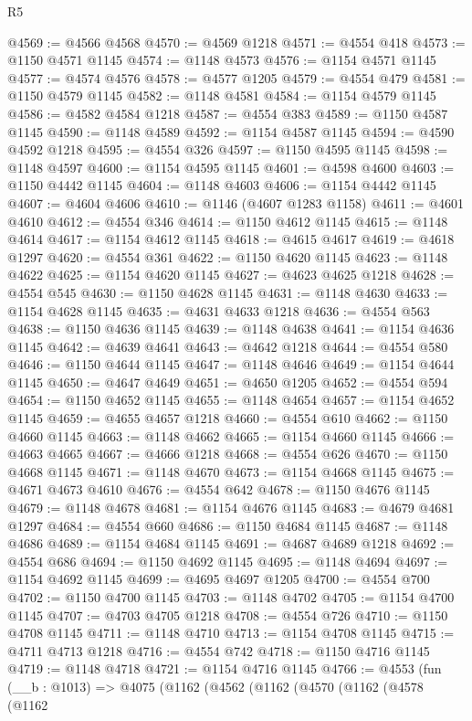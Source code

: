 \begin{lexlean}{R5}
\begin{coremodule}
@4569 := @4566 @4568
@4570 := @4569 @1218
@4571 := @4554 @418
@4573 := @1150 @4571 @1145
@4574 := @1148 @4573
@4576 := @1154 @4571 @1145
@4577 := @4574 @4576
@4578 := @4577 @1205
@4579 := @4554 @479
@4581 := @1150 @4579 @1145
@4582 := @1148 @4581
@4584 := @1154 @4579 @1145
@4586 := @4582 @4584 @1218
@4587 := @4554 @383
@4589 := @1150 @4587 @1145
@4590 := @1148 @4589
@4592 := @1154 @4587 @1145
@4594 := @4590 @4592 @1218
@4595 := @4554 @326
@4597 := @1150 @4595 @1145
@4598 := @1148 @4597
@4600 := @1154 @4595 @1145
@4601 := @4598 @4600
@4603 := @1150 @4442 @1145
@4604 := @1148 @4603
@4606 := @1154 @4442 @1145
@4607 := @4604 @4606
@4610 := @1146 (@4607 @1283 @1158)
@4611 := @4601 @4610
@4612 := @4554 @346
@4614 := @1150 @4612 @1145
@4615 := @1148 @4614
@4617 := @1154 @4612 @1145
@4618 := @4615 @4617
@4619 := @4618 @1297
@4620 := @4554 @361
@4622 := @1150 @4620 @1145
@4623 := @1148 @4622
@4625 := @1154 @4620 @1145
@4627 := @4623 @4625 @1218
@4628 := @4554 @545
@4630 := @1150 @4628 @1145
@4631 := @1148 @4630
@4633 := @1154 @4628 @1145
@4635 := @4631 @4633 @1218
@4636 := @4554 @563
@4638 := @1150 @4636 @1145
@4639 := @1148 @4638
@4641 := @1154 @4636 @1145
@4642 := @4639 @4641
@4643 := @4642 @1218
@4644 := @4554 @580
@4646 := @1150 @4644 @1145
@4647 := @1148 @4646
@4649 := @1154 @4644 @1145
@4650 := @4647 @4649
@4651 := @4650 @1205
@4652 := @4554 @594
@4654 := @1150 @4652 @1145
@4655 := @1148 @4654
@4657 := @1154 @4652 @1145
@4659 := @4655 @4657 @1218
@4660 := @4554 @610
@4662 := @1150 @4660 @1145
@4663 := @1148 @4662
@4665 := @1154 @4660 @1145
@4666 := @4663 @4665
@4667 := @4666 @1218
@4668 := @4554 @626
@4670 := @1150 @4668 @1145
@4671 := @1148 @4670
@4673 := @1154 @4668 @1145
@4675 := @4671 @4673 @4610
@4676 := @4554 @642
@4678 := @1150 @4676 @1145
@4679 := @1148 @4678
@4681 := @1154 @4676 @1145
@4683 := @4679 @4681 @1297
@4684 := @4554 @660
@4686 := @1150 @4684 @1145
@4687 := @1148 @4686
@4689 := @1154 @4684 @1145
@4691 := @4687 @4689 @1218
@4692 := @4554 @686
@4694 := @1150 @4692 @1145
@4695 := @1148 @4694
@4697 := @1154 @4692 @1145
@4699 := @4695 @4697 @1205
@4700 := @4554 @700
@4702 := @1150 @4700 @1145
@4703 := @1148 @4702
@4705 := @1154 @4700 @1145
@4707 := @4703 @4705 @1218
@4708 := @4554 @726
@4710 := @1150 @4708 @1145
@4711 := @1148 @4710
@4713 := @1154 @4708 @1145
@4715 := @4711 @4713 @1218
@4716 := @4554 @742
@4718 := @1150 @4716 @1145
@4719 := @1148 @4718
@4721 := @1154 @4716 @1145
@4766 := @4553
    (fun (__b : @1013) =>
    @4075
      (@1162
        (@4562
          (@1162
            (@4570
              (@1162
                (@4578
                  (@1162

\end{coremodule}
\end{lexlean}
